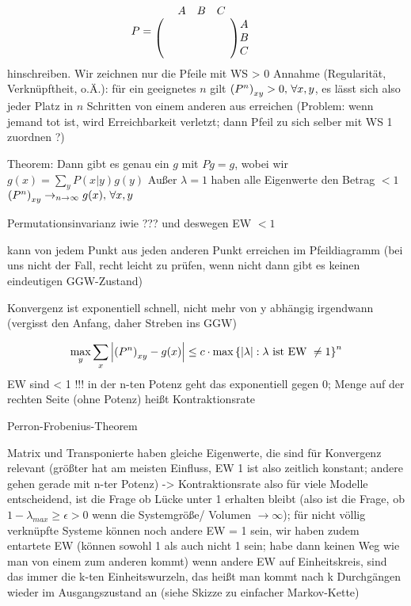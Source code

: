 \documentclass[../KlassMech_main.tex]{subfiles}
\begin{document}
\begin{equation*}\label{key}
P = \mqty{ 
	\mqty{ A & B & C} & \rule{20pt}{0pt}
	\\
	\mqty(
		\rule{10pt}{0pt} & \rule{10pt}{0pt} & \rule{20pt}{0pt}
		\\
		\rule{10pt}{0pt} & \rule{10pt}{0pt} & \rule{20pt}{0pt}
		\\
		\rule{10pt}{0pt} & \rule{10pt}{0pt} & \rule{20pt}{0pt}
	) 
	\mqty{ A \\ B \\ C}}
\end{equation*}
hinschreiben.
Wir zeichnen nur die Pfeile mit WS > 0
Annahme (Regularität, Verknüpftheit, o.Ä.): für ein geeignetes $n$ gilt $\qty(P^n)_{xy} > 0, \, \forall x,y$, es lässt sich also jeder Platz in $n$ Schritten von einem anderen aus erreichen (Problem: wenn jemand tot ist, wird Erreichbarkeit verletzt; dann Pfeil zu sich selber mit WS 1 zuordnen ?)

Theorem: Dann gibt es genau ein $g$ mit $Pg = g$, wobei wir $g(x) = \sum\limits_y P(x|y) g(y)$
Außer $\lambda = 1$ haben alle Eigenwerte den Betrag $< 1$
$\qty(P^n)_{xy} \rightarrow_{n\rightarrow \infty} g(x), \, \forall x,y$

Permutationsinvarianz iwie ??? und deswegen EW $< 1$



kann von jedem Punkt aus jeden anderen Punkt erreichen im Pfeildiagramm (bei uns nicht der Fall, recht leicht zu prüfen, wenn nicht dann gibt es keinen eindeutigen GGW-Zustand)

Konvergenz ist exponentiell schnell, nicht mehr von y abhängig irgendwann (vergisst den Anfang, daher Streben ins GGW)

\begin{equation}\label{key}
\max_y \sum\limits_x \abs{ \qty(P^n)_{xy} - g(x) } \leq c \cdot \max\qty{\abs{\lambda}: \lambda \text{ ist EW }\neq 1}^n
\end{equation}
EW sind < 1 !!! in der n-ten Potenz geht das exponentiell gegen 0; Menge auf der rechten Seite (ohne Potenz) heißt Kontraktionsrate

Perron-Frobenius-Theorem

Matrix und Transponierte haben gleiche Eigenwerte, die sind für Konvergenz relevant (größter hat am meisten Einfluss, EW 1 ist also zeitlich konstant; andere gehen gerade mit n-ter Potenz)
-> Kontraktionsrate also für viele Modelle entscheidend, ist die Frage ob Lücke unter 1 erhalten bleibt (also ist die Frage, ob $1 - \lambda_{max} \geq \epsilon > 0$ wenn die Systemgröße/ Volumen $\rightarrow \infty$); für nicht völlig verknüpfte Systeme können noch andere EW = 1 sein, wir haben zudem entartete EW (können sowohl 1 als auch nicht 1 sein; habe dann keinen Weg wie man von einem zum anderen kommt)
wenn andere EW auf Einheitskreis, sind das immer die k-ten Einheitswurzeln, das heißt man kommt nach k Durchgängen wieder im Ausgangszustand an (siehe Skizze zu einfacher Markov-Kette)
\end{document}

